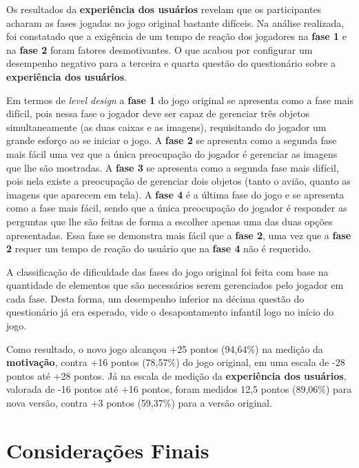 \documentclass[alpha-refs,brazilian]{RBCA_v2.0}
\begin{document}
Os resultados da \textbf{experiência dos usuários} revelam que os participantes acharam as fases jogadas no jogo original bastante difíceis. Na análise realizada, foi constatado que a exigência de um tempo de reação dos jogadores na \textbf{fase 1} e na \textbf{fase 2} foram fatores desmotivantes. O que acabou por configurar um desempenho negativo para a terceira e quarta questão do questionário sobre a \textbf{experiência dos usuários}.

\newpage

Em termos de \textit{level design} a \textbf{fase 1} do jogo original se apresenta como a fase mais difícil, pois nessa fase o jogador deve ser capaz de gerenciar três objetos simultaneamente (as duas caixas e as imagens), requisitando do jogador um grande esforço ao se iniciar o jogo. A \textbf{fase 2} se apresenta como a segunda fase mais fácil uma vez que a única preocupação do jogador é gerenciar as imagens que lhe são mostradas. A \textbf{fase 3} se apresenta como a segunda fase mais difícil, pois nela existe a preocupação de gerenciar dois objetos (tanto o avião, quanto as imagens que aparecem em tela). A \textbf{fase 4} é a última fase do jogo e se apresenta como a fase mais fácil, sendo que a única preocupação do jogador é responder as perguntas que lhe são feitas de forma a escolher apenas uma das duas opções apresentadas. Essa fase se demonstra mais fácil que a \textbf{fase 2}, uma vez que a \textbf{fase 2} requer um tempo de reação do usuário que na \textbf{fase 4} não é requerido.

A classificação de dificuldade das fases do jogo original foi feita com base na quantidade de elementos que são necessários serem gerenciados pelo jogador em cada fase. Desta forma, um desempenho inferior na décima questão do questionário já era esperado, vide o desapontamento infantil logo no início do jogo. 

Como resultado, o novo jogo  alcançou +25 pontos (94,64\%) na medição da \textbf{motivação}, contra +16 pontos (78,57\%) do jogo original, em uma escala de -28 pontos até +28 pontos. Já na escala de medição da \textbf{experiência dos usuários}, valorada de -16 pontos até +16 pontos, foram medidos 12,5 pontos (89,06\%) para nova versão, contra +3 pontos (59,37\%) para a versão original. %

\newpage

\section{Considerações Finais}\label{secao:ConsideracoesFinais}
\end{document}
